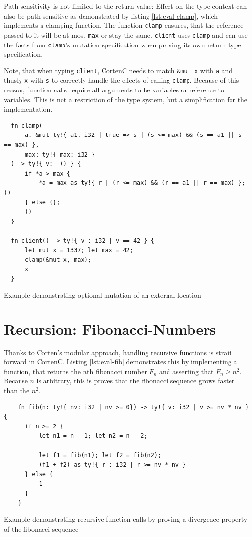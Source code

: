 \documentclass{book}
\newcommand{\code}[1]{\texttt{#1}}
\theoremstyle{definition}
\begin{document}
Path sensitivity is not limited to the return value: Effect on the type context can also be path sensitive as demonstrated by listing \ref{lst:eval-clamp}, which implements a clamping function. The function \code{clamp} ensures, that the reference passed to it will be at most \code{max} or stay the same. \code{client} uses \code{clamp} and can use the facts from \code{clamp}'s mutation specification when proving its own return type specification.

Note, that when typing \code{client}, CortenC needs to match \code{\&mut x} with \code{a} and thusly \code{x} with \code{s} to correctly handle the effects of calling \code{clamp}. Because of this reason, function calls require all arguments to be variables or reference to variables. This is not a restriction of the type system, but a simplification for the implementation.

\begin{listing}[ht]
  \begin{verbatim}
  fn clamp(
      a: &mut ty!{ a1: i32 | true => s | (s <= max) && (s == a1 || s == max) }, 
      max: ty!{ max: i32 }
  ) -> ty!{ v:  () } {
      if *a > max {
          *a = max as ty!{ r | (r <= max) && (r == a1 || r == max) }; ()
      } else {};
      ()
  }

  fn client() -> ty!{ v : i32 | v == 42 } {
      let mut x = 1337; let max = 42;
      clamp(&mut x, max);
      x
  }
  \end{verbatim}
  \caption{Example demonstrating optional mutation of an external location}
  \label{lst:eval-clamp}
\end{listing}

\section{Recursion: Fibonacci-Numbers}

Thanks to Corten's modular approach, handling recursive functions is strait forward in CortenC. Listing \ref{lst:eval-fib} demonstrates this by implementing a function, that returns the $n$th fibonacci number $F_n$ and asserting that $F_n \geq n^2$. Because $n$ is arbitrary, this is proves that the fibonacci sequence grows faster than the $n^2$.


\begin{listing}[ht]
  \begin{verbatim}
    fn fib(n: ty!{ nv: i32 | nv >= 0}) -> ty!{ v: i32 | v >= nv * nv } {
      if n >= 2 {
          let n1 = n - 1; let n2 = n - 2;

          let f1 = fib(n1); let f2 = fib(n2);
          (f1 + f2) as ty!{ r : i32 | r >= nv * nv }
      } else {
          1
      }
    }
  \end{verbatim}
  \caption{Example demonstrating recursive function calls by proving a divergence property of the fibonacci sequence}
  \label{lst:eval-fib}
\end{listing}
\end{document}
